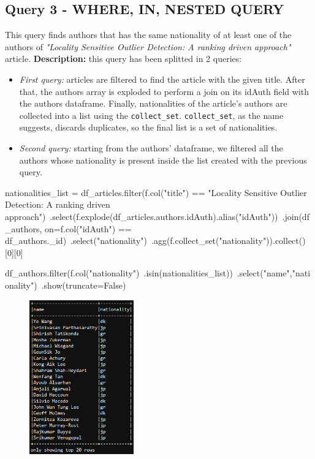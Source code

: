 \documentclass{Configuration_Files/PoliMi3i_thesis}
\begin{document}
\subsection{Query 3 - WHERE, IN, NESTED QUERY}
This query finds authors that has the same nationality of at least one of the authors of \emph{"Locality Sensitive Outlier
Detection: A ranking driven approach"} article.\newline
\textbf{Description:} this query has been splitted in 2 queries:
                        \begin{itemize}
                            \item \emph{First query:} articles are filtered to find the article with the given title. After that,
                                the authors array is exploded to perform a join on its idAuth field with the authors dataframe.
                                Finally, nationalities of the article's authors are collected into a list using the \verb |collect_set|.\newline
                                \verb|collect_set|, as the name suggests, discards duplicates, so the final list is a set of nationalities.
                            \item \emph{Second query:} starting from the authors' dataframe, we filtered all the authors whose nationality is
                                present inside the list created with the previous query.\\
                        \end{itemize}
\begin{python}
nationalities_list = df_articles.filter(f.col("title") == "Locality Sensitive Outlier Detection: A ranking driven approach")\
                                .select(f.explode(df_articles.authors.idAuth).alias("idAuth"))\
                                .join(df_authors, on=f.col("idAuth") == df_authors._id)\
                                .select("nationality")\
                                .agg(f.collect_set("nationality")).collect()[0][0]

df_authors.filter(f.col("nationality")\
          .isin(nationalities_list))\
          .select("name","nationality")\
          .show(truncate=False)
\end{python}
\begin{figure}[H]
\centering
\includegraphics[width=0.4\textwidth]{query/spark_q3.PNG}
\label{fig:query3}
\end{figure}
\end{document}
